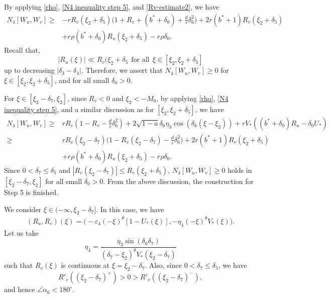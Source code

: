 \documentclass[11pt,a4paper]{article}
\numberwithin{equation}{section}
\numberwithin{figure}{section}
\newcommand\beaa{\begin{eqnarray*}}
\newcommand\eeaa{\end{eqnarray*}}
\begin{document}
By applying \eqref{rho}, \eqref{N4 inequality step 5}, and \eqref{Rv-estimate2}, we have
\begin{equation*}%
\begin{aligned}
N_4[W_u,W_v]\ge & -rR_v(\xi_2+\delta_5)\Big(1+R_v+(b^*+\delta_0)+\frac{d}{r}\delta_6^2\Big)+2r(b^*+1)R_v(\xi_2+\delta_5)\\&
+r\rho(b^*+\delta_0)R_u(\xi_2+\delta_5)-r\rho\delta_0.
\end{aligned}
\end{equation*}
Recall that,
$$|R_u(\xi)|\ll R_v(\xi_2+\delta_5\ \ \text{for all}\ \ \xi\in[\xi_2,\xi_2+\delta_5]$$
up to decreasing $|\delta_3-\delta_4|$.
Therefore, we assert that $N_4[W_u,W_v]\geq 0$ for $\xi\in[\xi_2,\xi_2+\delta_5]$,
and for all small $\delta_0>0$.


For $\xi\in[\xi_2-\delta_7,\xi_2]$, since $R_v<0$ and $\xi_2<-M_0$, by applying \eqref{rho}, \eqref{N4 inequality step 5}, and a similar discussion as for
$[\xi_2,\xi_2+\delta_5]$, we have
\begin{equation*}%
\begin{aligned}
N_4[W_u,W_v]\ge &rR_v(1-R_v-\frac{d}{r}\delta_6^2)+2\sqrt{1-a}\delta_6\eta_3\cos(\delta_6(\xi-\xi_2))+rV_*((b^*+\delta_0)R_u-\delta_0U_*)\\
\ge &rR_v(\xi_2-\delta_7)\Big(1-R_v(\xi_2-\delta_7)-\frac{d}{r}\delta_6^2\Big)+2r(b^*+1)R_v(\xi_2+\delta_5)\\
&+r\rho(b^*+\delta_0)R_u(\xi_2+\delta_5)-r\rho\delta_0.
\end{aligned}
\end{equation*}
Since $0<\delta_7\le \delta_5$ and $|R_v(\xi_2-\delta_7)|\le R_v(\xi_2+\delta_5)$, $N_4[W_u,W_v]\ge 0$ holds in $[\xi_2-\delta_7,\xi_2]$ for all small $\delta_0>0$. From the above discussion,
the construction for Step 5 is finished.

\medskip

 We consider $\xi\in(-\infty,\xi_2-\delta_7]$.
In this case, we have
\beaa
(R_u,R_v)(\xi)=\Big(-\varepsilon_4(-\xi)^{\theta}[1-U_*(\xi)],-\eta_4(-\xi)^{\theta}V_*(\xi)\Big).
\eeaa
Let us take $$\eta_4=\frac{\eta_3\sin(\delta_6\delta_7)}{(\delta_7-\xi_2)^{\theta}V_*(\xi_2-\delta_7)}$$
 such that
$R_v(\xi)$ is continuous at $\xi=\xi_2-\delta_7$.
Also, since $0<\delta_7\le \delta_5$, we have
$$R'_v((\xi_2-\delta_7)^+)>0>R'_v((\xi_2-\delta_7)^-),$$ %
and hence $\angle\alpha_6<180^{\circ}$.
\end{document}
